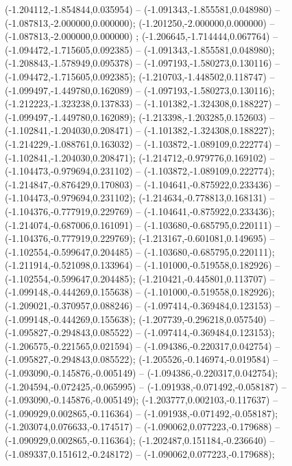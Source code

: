  (-1.204112,-1.854844,0.035954) -- (-1.091343,-1.855581,0.048980) -- (-1.087813,-2.000000,0.000000);
 (-1.201250,-2.000000,0.000000) -- (-1.087813,-2.000000,0.000000) ;
 (-1.206645,-1.714444,0.067764) -- (-1.094472,-1.715605,0.092385) -- (-1.091343,-1.855581,0.048980);
 (-1.208843,-1.578949,0.095378) -- (-1.097193,-1.580273,0.130116) -- (-1.094472,-1.715605,0.092385);
 (-1.210703,-1.448502,0.118747) -- (-1.099497,-1.449780,0.162089) -- (-1.097193,-1.580273,0.130116);
 (-1.212223,-1.323238,0.137833) -- (-1.101382,-1.324308,0.188227) -- (-1.099497,-1.449780,0.162089);
 (-1.213398,-1.203285,0.152603) -- (-1.102841,-1.204030,0.208471) -- (-1.101382,-1.324308,0.188227);
 (-1.214229,-1.088761,0.163032) -- (-1.103872,-1.089109,0.222774) -- (-1.102841,-1.204030,0.208471);
 (-1.214712,-0.979776,0.169102) -- (-1.104473,-0.979694,0.231102) -- (-1.103872,-1.089109,0.222774);
 (-1.214847,-0.876429,0.170803) -- (-1.104641,-0.875922,0.233436) -- (-1.104473,-0.979694,0.231102);
 (-1.214634,-0.778813,0.168131) -- (-1.104376,-0.777919,0.229769) -- (-1.104641,-0.875922,0.233436);
 (-1.214074,-0.687006,0.161091) -- (-1.103680,-0.685795,0.220111) -- (-1.104376,-0.777919,0.229769);
 (-1.213167,-0.601081,0.149695) -- (-1.102554,-0.599647,0.204485) -- (-1.103680,-0.685795,0.220111);
 (-1.211914,-0.521098,0.133964) -- (-1.101000,-0.519558,0.182926) -- (-1.102554,-0.599647,0.204485);
 (-1.210421,-0.445801,0.113707) -- (-1.099148,-0.444269,0.155638) -- (-1.101000,-0.519558,0.182926);
 (-1.209021,-0.370957,0.088246) -- (-1.097414,-0.369484,0.123153) -- (-1.099148,-0.444269,0.155638);
 (-1.207739,-0.296218,0.057540) -- (-1.095827,-0.294843,0.085522) -- (-1.097414,-0.369484,0.123153);
 (-1.206575,-0.221565,0.021594) -- (-1.094386,-0.220317,0.042754) -- (-1.095827,-0.294843,0.085522);
 (-1.205526,-0.146974,-0.019584) -- (-1.093090,-0.145876,-0.005149) -- (-1.094386,-0.220317,0.042754);
 (-1.204594,-0.072425,-0.065995) -- (-1.091938,-0.071492,-0.058187) -- (-1.093090,-0.145876,-0.005149);
 (-1.203777,0.002103,-0.117637) -- (-1.090929,0.002865,-0.116364) -- (-1.091938,-0.071492,-0.058187);
 (-1.203074,0.076633,-0.174517) -- (-1.090062,0.077223,-0.179688) -- (-1.090929,0.002865,-0.116364);
 (-1.202487,0.151184,-0.236640) -- (-1.089337,0.151612,-0.248172) -- (-1.090062,0.077223,-0.179688);
